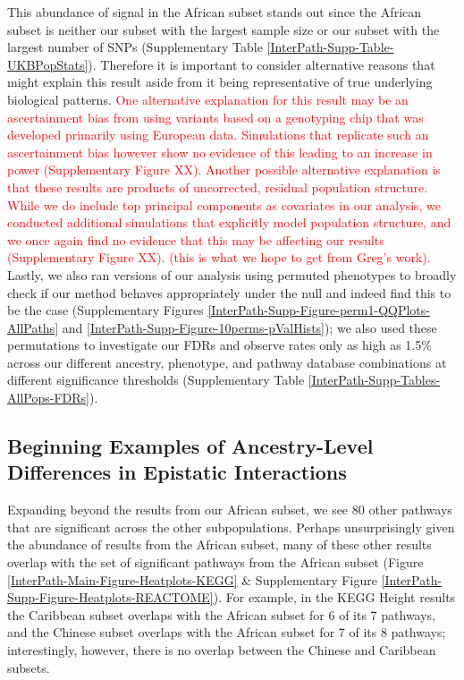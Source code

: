 \documentclass[12pt,a4paper]{article}
\begin{document}
This abundance of signal in the African subset stands out since the African subset is neither our subset with the largest sample size or our subset with the largest number of SNPs (Supplementary Table \ref{InterPath-Supp-Table-UKBPopStats}). Therefore it is important to consider alternative reasons that might explain this result aside from it being representative of true underlying biological patterns. \textcolor{red}{One alternative explanation for this result may be an ascertainment bias from using variants based on a genotyping chip that was developed primarily using European data. Simulations that replicate such an ascertainment bias however show no evidence of this leading to an increase in power (Supplementary Figure XX). Another possible alternative explanation is that these results are products of uncorrected, residual population structure. While we do include top principal components as covariates in our analysis, we conducted additional simulations that explicitly model population structure, and we once again find no evidence that this may be affecting our results (Supplementary Figure XX). (this is what we hope to get from Greg's work).} Lastly, we also ran versions of our analysis using permuted phenotypes to broadly check if our method behaves appropriately under the null and indeed find this to be the case (Supplementary Figures \ref{InterPath-Supp-Figure-perm1-QQPlots-AllPaths} and \ref{InterPath-Supp-Figure-10perms-pValHists}); we also used these permutations to investigate our FDRs and observe rates only as high as 1.5\% across our different ancestry, phenotype, and pathway database combinations at different significance thresholds (Supplementary Table \ref{InterPath-Supp-Tables-AllPops-FDRs}).

\subsection{Beginning Examples of Ancestry-Level Differences in Epistatic Interactions}

Expanding beyond the results from our African subset, we see 80 other pathways that are significant across the other subpopulations. Perhaps unsurprisingly given the abundance of results from the African subset, many of these other results overlap with the set of significant pathways from the African subset (Figure \ref{InterPath-Main-Figure-Heatplots-KEGG} \& Supplementary Figure \ref{InterPath-Supp-Figure-Heatplots-REACTOME}). For example, in the KEGG Height results the Caribbean subset overlaps with the African subset for 6 of its 7 pathways, and the Chinese subset overlaps with the African subset for 7 of its 8 pathways; interestingly, however, there is no overlap between the Chinese and Caribbean subsets. 
\end{document}
